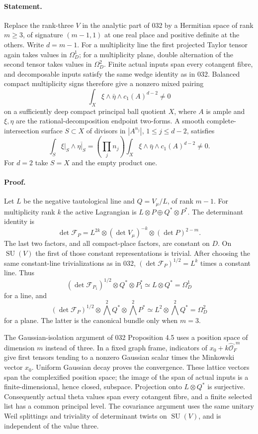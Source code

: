 \documentclass[11pt]{article}
\newcommand{\OO}{\mathcal O}
\newcommand{\SU}{\operatorname{SU}}
\begin{document}
\paragraph{Statement.}
Replace the rank-three $V$ in the analytic part of 032 by a Hermitian
space of rank $m\geq3$, of signature $(m-1,1)$ at one real place and
positive definite at the others. Write $d=m-1$. For a multiplicity line
the first projected Taylor tensor again takes values in $\Omega_D^1$;
for a multiplicity plane, double alternation of the second tensor takes
values in $\Omega_D^2$. Finite actual inputs span every cotangent
fibre, and decomposable inputs satisfy the same wedge identity as in
032. Balanced compact multiplicity signs therefore give a nonzero
mixed pairing
\begin{equation}\label{A4-pair}
 \int_X\xi\wedge\bar\eta\wedge c_1(A)^{d-2}\ne0
\end{equation}
on a sufficiently deep compact principal ball quotient $X$, where
$A$ is ample and $\xi,\eta$ are the rational-decomposition endpoint
two-forms. A smooth complete-intersection surface $S\subset X$ of
divisors in $|A^{n_j}|$, $1\leq j\leq d-2$, satisfies
\[
 \int_S\xi|_S\wedge\overline{\eta|_S}
 =\left(\prod_jn_j\right)
      \int_X\xi\wedge\bar\eta\wedge c_1(A)^{d-2}\ne0.
\]
For $d=2$ take $S=X$ and the empty product one.

\paragraph{Proof.}
Let $L$ be the negative tautological line and $Q=V_\mu/L$, of rank
$m-1$. For multiplicity rank $k$ the active Lagrangian is
$L\otimes P\oplus Q^*\otimes P^*$. The determinant identity is
\[
 \det\mathcal F_P
 =L^{2k}\otimes(\det V_\mu)^{-k}\otimes(\det P)^{2-m}.
\]
The last two factors, and all compact-place factors, are constant on
$D$. On $\SU(V)$ the first of those constant representations is
trivial. After choosing the same constant-line trivializations as in
032, $(\det\mathcal F_P)^{1/2}=L^k$ times a constant line. Thus
\[
 (\det\mathcal F_{P_1})^{1/2}\otimes Q^*\otimes P_1^*
       \simeq L\otimes Q^*=\Omega_D^1
\]
for a line, and
\[
 (\det\mathcal F_P)^{1/2}\otimes
             \bigwedge^2Q^*\otimes\bigwedge^2P^*
       \simeq L^2\otimes\bigwedge^2Q^*=\Omega_D^2
\]
for a plane. The latter is the canonical bundle only when $m=3$.

The Gaussian-isolation argument of 032 Proposition 4.5 uses a position
space of dimension $m$ instead of three. In a fixed graph frame,
indicators of $x_0+k\widehat{\OO}_F^{,m}$ give first tensors tending
to a nonzero Gaussian scalar times the Minkowski vector $x_0$.
Uniform Gaussian decay proves the convergence. These lattice vectors
span the complexified position space; the image of the span of actual
inputs is a finite-dimensional, hence closed, subspace. Projection
onto $L\otimes Q^*$ is surjective. Consequently actual theta values
span every cotangent fibre, and a finite selected list has a common
principal level. The covariance argument uses the same unitary Weil
splittings and triviality of determinant twists on $\SU(V)$, and is
independent of the value three.
\end{document}

